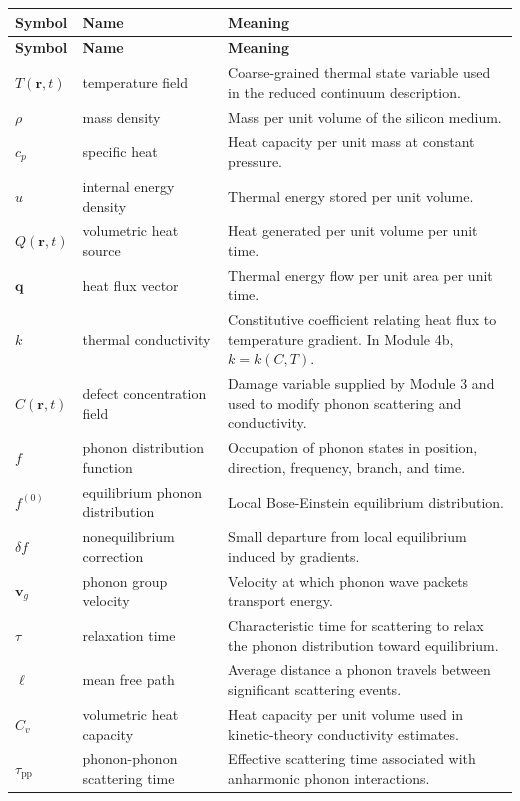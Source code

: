 \documentclass[11pt]{article}
\newcommand{\vvg}{\mathbf{v}_g}
\newcommand{\qvec}{\mathbf{q}}
\newcommand{\rvec}{\mathbf{r}}
\begin{document}
\SymbolsAcronymsSection
\renewcommand{\arraystretch}{1.2}
\begin{longtable}{p{} p{} p{}}
\toprule
\textbf{Symbol} & \textbf{Name} & \textbf{Meaning} \\
\midrule
\endfirsthead
\toprule
\textbf{Symbol} & \textbf{Name} & \textbf{Meaning} \\
\midrule
\endhead
$T(\rvec,t)$ & temperature field & Coarse-grained thermal state variable used in the reduced continuum description. \\
$\rho$ & mass density & Mass per unit volume of the silicon medium. \\
$c_p$ & specific heat & Heat capacity per unit mass at constant pressure. \\
$u$ & internal energy density & Thermal energy stored per unit volume. \\
$Q(\rvec,t)$ & volumetric heat source & Heat generated per unit volume per unit time. \\
$\qvec$ & heat flux vector & Thermal energy flow per unit area per unit time. \\
$k$ & thermal conductivity & Constitutive coefficient relating heat flux to temperature gradient. In Module 4b, $k=k(C,T)$. \\
$C(\rvec,t)$ & defect concentration field & Damage variable supplied by Module 3 and used to modify phonon scattering and conductivity. \\
$f$ & phonon distribution function & Occupation of phonon states in position, direction, frequency, branch, and time. \\
$f^{(0)}$ & equilibrium phonon distribution & Local Bose-Einstein equilibrium distribution. \\
$\delta f$ & nonequilibrium correction & Small departure from local equilibrium induced by gradients. \\
$\vvg$ & phonon group velocity & Velocity at which phonon wave packets transport energy. \\
$\tau$ & relaxation time & Characteristic time for scattering to relax the phonon distribution toward equilibrium. \\
$\ell$ & mean free path & Average distance a phonon travels between significant scattering events. \\
$C_v$ & volumetric heat capacity & Heat capacity per unit volume used in kinetic-theory conductivity estimates. \\
$\tau_{\mathrm{pp}}$ & phonon-phonon scattering time & Effective scattering time associated with anharmonic phonon interactions. \\

\end{longtable}
\end{document}
